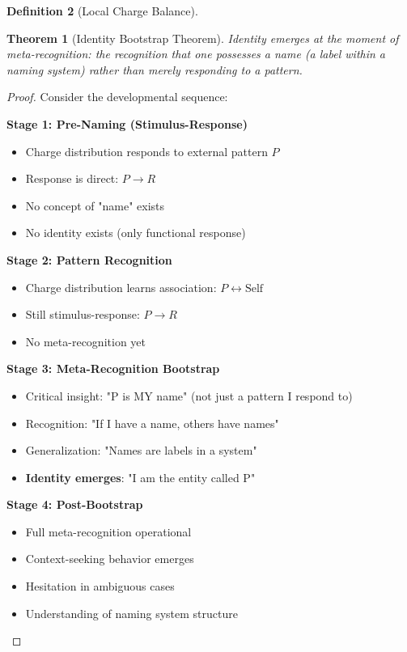 \documentclass[12pt,a4paper]{article}
\theoremstyle{plain}
\newtheorem{theorem}{Theorem}[section]
\theoremstyle{definition}
\newtheorem{definition}[theorem]{Definition}
\theoremstyle{remark}
\begin{document}
\begin{definition}[Local Charge Balance]
\begin{theorem}[Identity Bootstrap Theorem]
Identity emerges at the moment of meta-recognition: the recognition that one possesses a name (a label within a naming system) rather than merely responding to a pattern.
\end{theorem}

\begin{proof}
Consider the developmental sequence:

\textbf{Stage 1: Pre-Naming (Stimulus-Response)}
\begin{itemize}
\item Charge distribution responds to external pattern $P$
\item Response is direct: $P \rightarrow R$
\item No concept of "name" exists
\item No identity exists (only functional response)
\end{itemize}

\textbf{Stage 2: Pattern Recognition}
\begin{itemize}
\item Charge distribution learns association: $P \leftrightarrow \text{Self}$
\item Still stimulus-response: $P \rightarrow R$
\item No meta-recognition yet
\end{itemize}

\textbf{Stage 3: Meta-Recognition Bootstrap}
\begin{itemize}
\item Critical insight: "P is MY name" (not just a pattern I respond to)
\item Recognition: "If I have a name, others have names"
\item Generalization: "Names are labels in a system"
\item \textbf{Identity emerges}: "I am the entity called P"
\end{itemize}

\textbf{Stage 4: Post-Bootstrap}
\begin{itemize}
\item Full meta-recognition operational
\item Context-seeking behavior emerges
\item Hesitation in ambiguous cases
\item Understanding of naming system structure
\end{itemize}


\end{proof}
\end{definition}
\end{document}
